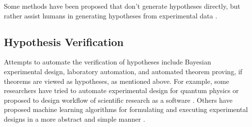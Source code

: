 Some methods have been proposed that don't generate hypotheses directly, but rather assist humans in generating hypotheses from experimental data 
 \cite{friederich2021scientific}.

\subsection{Hypothesis Verification}
Attempts to automate the verification of hypotheses include Bayesian experimental design, laboratory automation, and automated theorem proving, if theorems are viewed as hypotheses, as mentioned above. For example, some researchers have tried to automate experimental design for quantum physics \cite{ruiz2022digital} or proposed to design workflow of scientific research as a software \cite{goble2020fair}. Others have proposed machine learning algorithms for formulating and executing experimental designs in a more abstract and simple manner \cite{herrmann2022learning}. 





